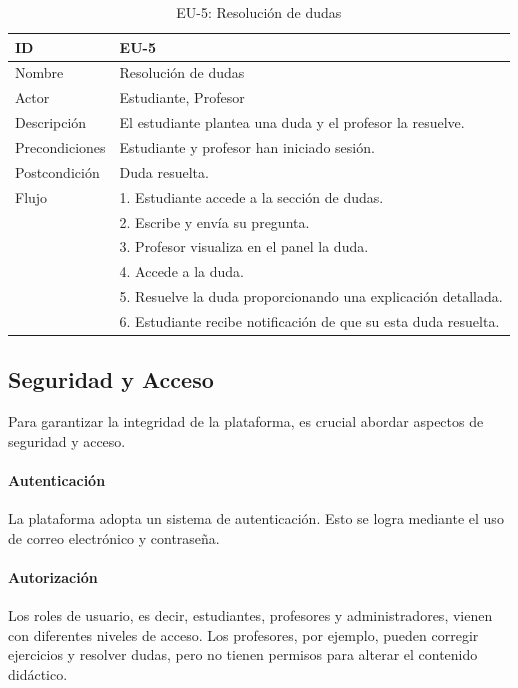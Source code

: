 \begin{table}[H]
    \centering
    \begin{tabularx}{\textwidth}{|l|X|}
    \hline
    ID & EU-5 \\
    \hline
    Nombre & Resolución de dudas \\
    \hline
    Actor & Estudiante, Profesor \\
    \hline
    Descripción & El estudiante plantea una duda y el profesor la resuelve. \\
    \hline
    Precondiciones & Estudiante y profesor han iniciado sesión. \\
    \hline
    Postcondición & Duda resuelta. \\
    \hline
    Flujo & 
    1. Estudiante accede a la sección de dudas. \\
    & 2. Escribe y envía su pregunta. \\
    & 3. Profesor visualiza en el panel la duda. \\
    & 4. Accede a la duda. \\
    & 5. Resuelve la duda proporcionando una explicación detallada. \\
    & 6. Estudiante recibe notificación de que su esta duda resuelta. \\
    \hline
    \end{tabularx}
    \caption{EU-5: Resolución de dudas}
\end{table}

\subsection{Seguridad y Acceso}

Para garantizar la integridad de la plataforma, es crucial abordar aspectos de seguridad y acceso.

\paragraph{Autenticación}
La plataforma adopta un sistema de autenticación. Esto se logra mediante el uso de correo electrónico y contraseña. 

\paragraph{Autorización}
Los roles de usuario, es decir, estudiantes, profesores y administradores, vienen con diferentes niveles de acceso. Los profesores, por ejemplo, pueden corregir ejercicios y resolver dudas, pero no tienen permisos para alterar el contenido didáctico.

